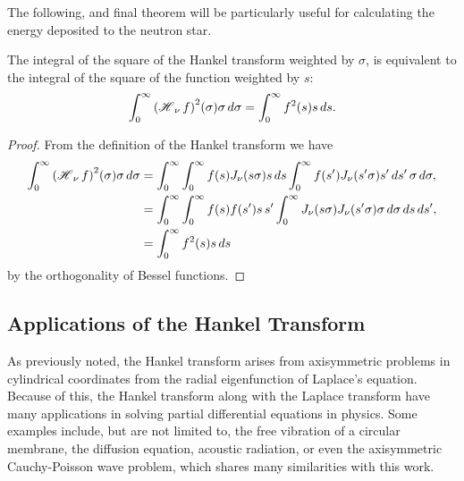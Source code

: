 The following, and final theorem will be particularly useful for calculating the energy deposited to the neutron star.
\begin{theorem}
\label{thm:square}
The integral of the square of the Hankel transform weighted by $\sigma$, is equivalent to the integral of the square of the function weighted by $s$:
\begin{align*}
\int_0^\infty \Hank[\nu]{f}^2(\sigma) \sigma \, d\sigma = \int_0^\infty f^2(s)s \, ds.
\end{align*}
\end{theorem}

\begin{proof}
From the definition of the Hankel transform we have
\begin{align*}
\int_0^\infty \Hank[\nu]{f}^2(\sigma) \sigma \, d\sigma &= \int_0^\infty \int_0^\infty f(s) J_\nu(s \sigma) s \, ds \int_0^\infty f(s') J_\nu(s' \sigma) s' \, ds' \, \sigma \, d\sigma, \\
&= \int_0^\infty \int_0^\infty f(s) f(s') s \, s' \int_0^\infty J_\nu(s \sigma) J_\nu(s' \sigma) \sigma \, d\sigma \, ds \, ds', \\
&= \int_0^\infty f^2(s) s \, ds
\end{align*}
by the orthogonality of Bessel functions.
\end{proof}

\subsection{Applications of the Hankel Transform}

As previously noted, the Hankel transform arises from axisymmetric problems in cylindrical coordinates from the radial eigenfunction of Laplace's equation. Because of this, the Hankel transform along with the Laplace transform have many applications in solving partial differential equations in physics. Some examples include, but are not limited to, the free vibration of a circular membrane, the diffusion equation, acoustic radiation, or even the axisymmetric Cauchy-Poisson wave problem, which shares many similarities with this work.

%
